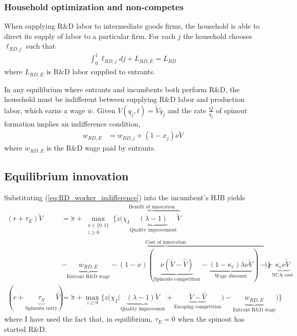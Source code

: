 \documentclass[12pt,english]{article}
\theoremstyle{remark}
\begin{document}
\subsubsection{Household optimization and non-competes}

When supplying R\&D labor to intermediate goods firms, the household is able to direct its supply of labor to a particular firm. For each $j$ the household chooses $\ell_{RD,j}$ such that
\begin{align}
\int_0^1 \ell_{RD,j} dj + L_{RD,E} = L_{RD}
\end{align}
where $L_{RD,E}$ is R\&D labor supplied to entrants. 

In any equilibrium where entrants and incumbents both perform R\&D, the household must be indifferent between supplying R\&D labor and production labor, which earns a wage $\bar{w}$. Given $V(q_j,t) = \tilde{V}q_j$ and the rate $\frac{Q}{q_j}$ of spinout formation implies an indifference condition, 
\begin{align}
	w_{RD,E} &= w_{RD,j} + (1-x_j) \nu  \tilde{V} \label{eq:RD_worker_indifference}
\end{align}
where $w_{RD,E}$ is the R\&D wage paid by entrants.


\subsection{Equilibrium innovation}

Substituting (\ref{eq:RD_worker_indifference}) into the incumbent's HJB yields
\begin{align}
	(r + \tau_E) \tilde{V} &= \tilde{\pi} + \max_{\substack{x \in \{0,1\} \\ z \ge 0}} \Big\{z \big(\overbrace{\chi_I \underbrace{(\lambda - 1)}_{\textrm{Quality improvement}} \tilde{V}}^{\textrm{Benefit of innovation}} \\
	&- \overbrace{   \underbrace{w_{RD,E}}_{\textrm{Entrant R\&D wage}} - (1-x) (\underbrace{\nu (\tilde{V}-\hat{V})}_{\textrm{Spinouts competition}} - \underbrace{(1-\kappa_{e})\lambda \nu \tilde{V} }_{\textrm{Wage discount}}) - x \underbrace{\kappa_{c} \nu \tilde{V}}_{\textrm{NCA cost}} }^{\textrm{Cost of innovation}} \big) \Big\} \label{eq:hjb_incumbent_workerIndiff} \\
	(r + \underbrace{\tau_S}_{\textrm{Spinouts entry}}) \hat{V} &= \tilde{\pi} + \max_{z \ge 0} \Big\{z \Big(\chi_I \big(\underbrace{(\lambda - 1) \tilde{V}}_{\textrm{Quality improvemnt}} + \underbrace{\tilde{V}- \hat{V}}_{\textrm{Escaping competition}}\big) - \underbrace{w_{RD,E}}_{\textrm{Entrant R\&D wage}}\Big) \Big\} \label{eq:hjb_incumbent_1_workerIndiff}
\end{align}
where I have used the fact that, in equilibrium, $\tau_E = 0$ when the spinout has started R\&D. 
\end{document}
